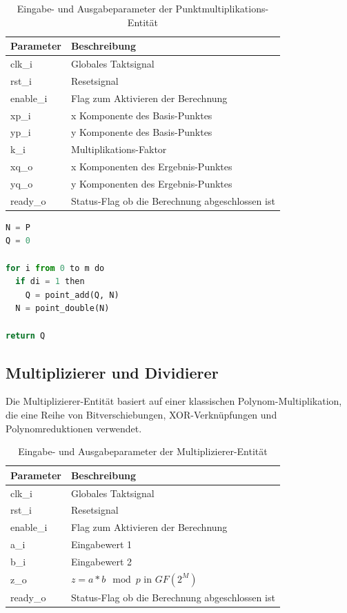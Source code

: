 \begin{table} [h]
	\centering 
	\begin{tabular}{ | p{3cm} | p{12cm} | }
		\hline
		\textbf{Parameter} & \textbf{Beschreibung}\\
		\hline
		clk\_i & Globales Taktsignal \\
		\hline
		rst\_i & Resetsignal \\
		\hline
		enable\_i & Flag zum Aktivieren der Berechnung \\
		\hline
		xp\_i & x Komponente des Basis-Punktes \\
		\hline
		yp\_i & y Komponente des Basis-Punktes \\
		\hline
		k\_i & Multiplikations-Faktor \\
		\hline
		xq\_o & x Komponenten des Ergebnis-Punktes \\
		\hline
		yq\_o & y Komponenten des Ergebnis-Punktes \\
		\hline
		ready\_o & Status-Flag ob die Berechnung abgeschlossen ist  \\
		\hline
		\hline
	\end{tabular}
	\caption{Eingabe- und Ausgabeparameter der Punktmultiplikations-Entität}
	\label{tab:vhdl-impl-eccmul-param}
\end{table}

\begin{lstlisting}[language=Python,frame=single,label=lst-pm-algo,caption=Pseudocode des Double-And-Add Algorithmus]
N = P
Q = 0

for i from 0 to m do
  if di = 1 then
    Q = point_add(Q, N)
  N = point_double(N)

return Q
\end{lstlisting}

\subsection{Multiplizierer und Dividierer}
Die Multiplizierer-Entität basiert auf einer klassischen Polynom-Multiplikation, die eine Reihe von Bitverschiebungen, XOR-Verknüpfungen und Polynomreduktionen verwendet. \\

\begin{table} [h]
	\centering 
	\begin{tabular}{ | p{3cm} | p{12cm} | }
		\hline
		\textbf{Parameter} & \textbf{Beschreibung}\\
		\hline
		clk\_i & Globales Taktsignal \\
		\hline
		rst\_i & Resetsignal \\
		\hline
		enable\_i & Flag zum Aktivieren der Berechnung \\
		\hline
		a\_i & Eingabewert 1 \\
		\hline
		b\_i & Eingabewert 2 \\
		\hline
		z\_o & $z = a*b \mod p$ in $GF(2^M)$ \\
		\hline
		ready\_o & Status-Flag ob die Berechnung abgeschlossen ist  \\
		\hline
		\hline
	\end{tabular}
	\caption{Eingabe- und Ausgabeparameter der Multiplizierer-Entität}
	\label{tab:vhdl-impl-mult-param}
\end{table}

